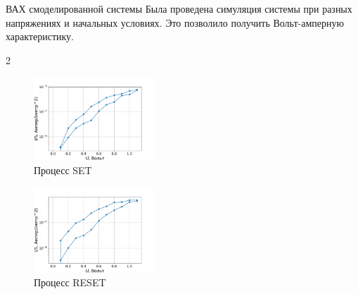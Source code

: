 \documentclass{beamer}%
\begin{document}
\begin{frame}{ВАХ смоделированной системы}
    Была проведена симуляция системы при разных напряжениях и начальных условиях.
    Это позволило получить Вольт-амперную характеристику.
    \begin {multicols}{2}
        \begin{figure}
            \centering
            \includegraphics[width=170px]{img/SET.pdf}
            \caption {Процесс SET}
        \end{figure}
        \columnbreak
        \begin{figure}
            \centering
            \includegraphics[width=170px]{img/RESET.pdf}
            \caption {Процесс RESET}
        \end{figure}   
    \end{multicols}

\end{frame}
\end{document}
